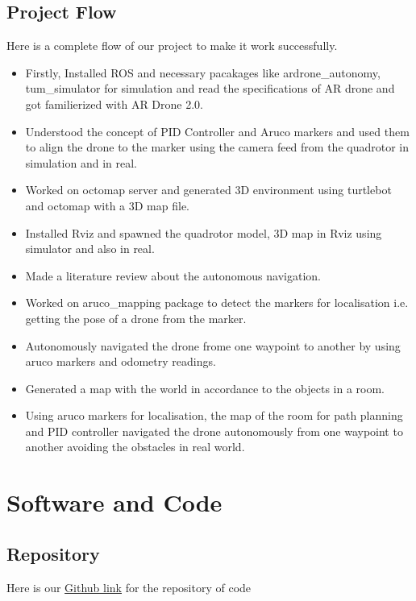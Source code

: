 \documentclass[a4paper,12pt,oneside]{book}
\begin{document}
\section{Project Flow}
Here is a complete flow of our project to make it work successfully.\\
\begin{itemize}
\item Firstly, Installed ROS and necessary pacakages like ardrone\_autonomy, tum\_simulator for simulation and read the specifications of AR drone and got familierized with AR Drone 2.0.

\item Understood the concept of PID Controller and Aruco markers and used them to align the drone to the marker using the camera feed from the quadrotor in simulation and in real.

\item Worked on octomap server and generated 3D environment using turtlebot and octomap with a 3D map file. 

\item Installed Rviz and spawned the quadrotor model, 3D map in Rviz using simulator and also in real.

\item Made a literature review about the autonomous navigation.

\item Worked on aruco\_mapping package to detect the markers for localisation i.e. getting the pose of a drone from the marker.

\item Autonomously navigated the drone frome one waypoint to another by using aruco markers and odometry readings.  

\item Generated a map with the world in accordance to the objects in a room.

\item Using aruco markers for localisation, the map of the room for path planning and PID controller navigated the drone autonomously from one waypoint to another avoiding the obstacles in real world.

\end{itemize}

\chapter[Software and Code]{Software and Code}
\section{Repository}
Here is our \href{https://github.com/eYSIP-2017/eYSIP-2017_Navigation-in-Indoor-Environments-using-drone/tree/master/scripts}{Github link} for the repository of code\\\
\end{document}

